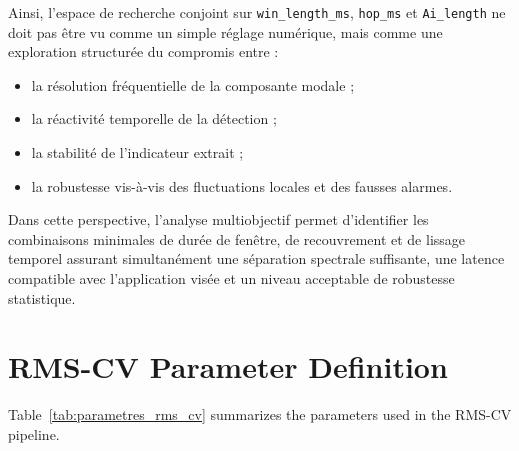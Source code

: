 \documentclass[12pt,a4paper, openany]{book}
\renewcommand{\arraystretch}{1.15}
\begin{document}
Ainsi, l'espace de recherche conjoint sur \texttt{win\_length\_ms}, \texttt{hop\_ms} et \texttt{Ai\_length} ne doit pas être vu comme un simple réglage numérique, mais comme une exploration structurée du compromis entre :
\begin{itemize}
    \item la résolution fréquentielle de la composante modale ;
    \item la réactivité temporelle de la détection ;
    \item la stabilité de l'indicateur extrait ;
    \item la robustesse vis-à-vis des fluctuations locales et des fausses alarmes.
\end{itemize}
\medskip

Dans cette perspective, l'analyse multiobjectif permet d'identifier les combinaisons minimales de durée de fenêtre, de recouvrement et de lissage temporel assurant simultanément une séparation spectrale suffisante, une latence compatible avec l'application visée et un niveau acceptable de robustesse statistique.


\chapter{RMS-CV Parameter Definition}

Table~\ref{tab:parametres_rms_cv} summarizes the parameters used in the RMS-CV pipeline.

\small
\renewcommand{\arraystretch}{1.15}
\end{document}
